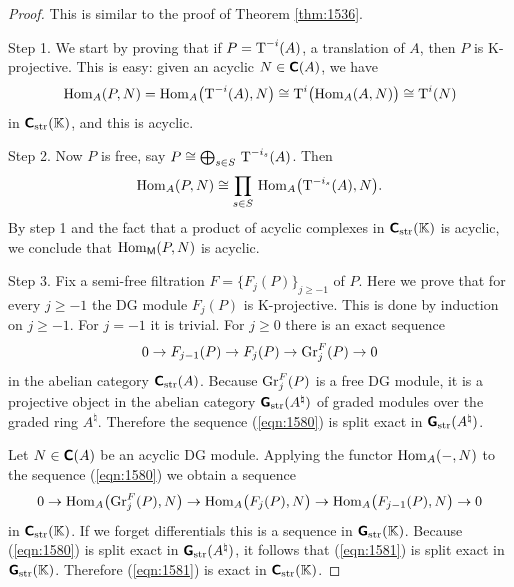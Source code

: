 \begin{proof}
This is similar to the proof of Theorem \ref{thm:1536}. 

\smallskip \noindent
Step 1. We start by proving that if $P = \operatorname{T}^{-i}(A)$, a translation of 
$A$, 
then $P$ is K-projective. This is easy: 
given an acyclic $N \in \boldsymbol{\mathsf{C}}(A)$, we have 
\[ \operatorname{Hom}_{A}(P, N) = 
\operatorname{Hom}_{A} \bigl( \operatorname{T}^{-i}(A), N \bigr) \cong
\operatorname{T}^{i} \bigl( \operatorname{Hom}_{A}(A, N) \bigr)
\cong \operatorname{T}^{i}(N)\]
in $\boldsymbol{\mathsf{C}}_{\mathrm{str}}(\mathbb{K})$, and this is acyclic. 

\medskip \noindent
Step 2. Now $P$ is free, say 
$P \cong \bigoplus_{s \in S} \, \operatorname{T}^{-i_s}(A)$.
Then 
\[ \operatorname{Hom}_{A}(P, N) \cong 
\prod_{s \in S} \, \operatorname{Hom}_{A} \bigl( \operatorname{T}^{-i_s}(A), N \bigr) . \]
By step 1 and the fact that a product of acyclic complexes in 
$\boldsymbol{\mathsf{C}}_{\mathrm{str}}(\mathbb{K})$ is 
acyclic, we conclude that $\operatorname{Hom}_{\operatorname{\mathsf{M}}}(P, N)$ is acyclic. 

\medskip \noindent
Step 3. Fix a semi-free filtration $F = \{ F_j(P) \}_{j \geq -1}$
of $P$. Here we prove that for every $j \geq -1$ the DG module  
$F_j(P)$ is K-projective. This is done by induction on $j \geq -1$. 
For $j = -1$ it is trivial. For $j \geq 0$ there is an exact sequence 
\begin{equation} \label{eqn:1580}
0 \to F_{j - 1}(P) \to F_j(P) \to \operatorname{Gr}^F_j(P) \to 0 
\end{equation}
in the abelian category $\boldsymbol{\mathsf{C}}_{\mathrm{str}}(A)$. 
Because 
$\operatorname{Gr}^F_j(P)$
is a free DG module, it is a projective object in the abelian category 
$\operatorname{\boldsymbol{\mathsf{G}}}_{\mathrm{str}}(A^{\natural})$ of graded modules over the graded ring 
$A^{\natural}$. 
Therefore the sequence (\ref{eqn:1580}) is split exact in 
$\operatorname{\boldsymbol{\mathsf{G}}}_{\mathrm{str}}(A^{\natural})$.

Let $N \in \boldsymbol{\mathsf{C}}(A)$ be an acyclic DG module. Applying the 
functor $\operatorname{Hom}_{A}(-, N)$ 
to the sequence (\ref{eqn:1580}) we obtain a sequence 
\begin{equation} \label{eqn:1581}
0 \to \operatorname{Hom}_{A} \bigl( \operatorname{Gr}^F_j(P), N \bigr) \to 
\operatorname{Hom}_{A} \bigl( F_j(P), N \bigr) \to
\operatorname{Hom}_{A} \bigl( F_{j - 1}(P), N \bigr) \to  0 
\end{equation}
in $\boldsymbol{\mathsf{C}}_{\mathrm{str}}(\mathbb{K})$. If we forget differentials this is a sequence in 
$\operatorname{\boldsymbol{\mathsf{G}}}_{\mathrm{str}}(\mathbb{K})$. Because (\ref{eqn:1580}) is split exact in 
$\operatorname{\boldsymbol{\mathsf{G}}}_{\mathrm{str}}(A^{\natural})$, it follows that  (\ref{eqn:1581}) is 
split 
exact in $\operatorname{\boldsymbol{\mathsf{G}}}_{\mathrm{str}}(\mathbb{K})$. Therefore (\ref{eqn:1581}) is exact in 
$\boldsymbol{\mathsf{C}}_{\mathrm{str}}(\mathbb{K})$.


\end{proof}

